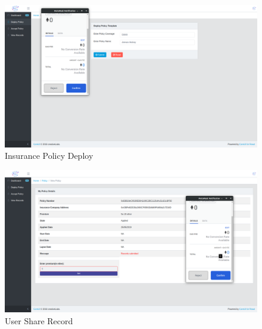 \begin{figure}[!b]
	\centering
	\includegraphics[width=\linewidth]{Images/Organisation/InsurancePolicyDeploy.png}
	\caption{Insurance Policy Deploy}
\end{figure}
\begin{figure}[!b]
	\centering
	\includegraphics[width=\linewidth]{Images/Organisation/InsuranceAcceptPolicy.png}
	\caption{ User Share Record}
\end{figure}

